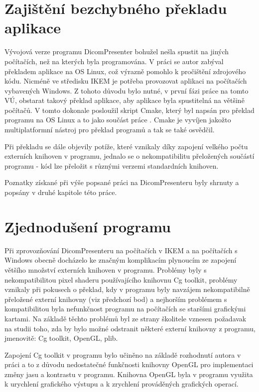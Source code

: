 \section{Zajištění bezchybného překladu aplikace}
Vývojová verze programu DicomPresenter bohužel nešla spustit na jiných počítačích, než na kterých byla programována. V práci \cite{flaska} se autor zabýval překladem aplikace na OS Linux, což výrazně pomohlo k pročištění zdrojového kódu. Nicméně ve středisku IKEM je potřeba provozovat aplikaci na počítačích vybavených Windows. Z tohoto důvodu bylo nutné, v první fázi práce na tomto VÚ, obstarat takový překlad aplikace, aby aplikace byla spustitelná na většině počítačů. V tomto dokonale posloužil skript Cmake, který byl napsán pro překlad programu na OS Linux a to jako součást práce \cite{flaska}. Cmake je vyvíjen jakožto multiplatformní nástroj pro překlad programů a tak se také osvědčil. 

Při překladu se dále objevily potíže, které vznikaly díky zapojení velkého počtu externích knihoven v programu, jednalo se o nekompatibilitu přeložených součástí programu - kód lze přeložit s různými verzemi standardních knihoven.

Poznatky získané při výše popsané práci na DicomPresenteru byly shrnuty a popsány v druhé kapitole této práce.

\section{Zjednodušení programu}
Při zprovozňování DicomPresenteru na počítačích v IKEM a na počítačích s Windows obecně docházelo ke značným komplikacím plynoucím ze zapojení většího množství externích knihoven v programu. Problémy byly s nekompatibilitou pixel shaderu používajícího knihovnu Cg toolkit, problémy vznikaly při pokusech o překlad, kdy v programu byly navzájem nekompatibilně přeložené externí knihovny (viz předchozí bod) a nejhorším problémem s kompatibilitou byla nefunkčnost programu na počítačích se staršími grafickými kartami. Na základě těchto problémů byl ze strany školitele vznesen požadavak na studii toho, zda by bylo možné odstranit některé externí knihovny z programu, jmenovitě: Cg toolkit, OpenGL, plib.

Zapojení Cg toolkit v programu bylo učiněno na základě rozhodnutí autora v práci \cite{neskudla} a to z důvodu nedostatečné funkčnosti knihovny OpenGL pro implementaci změny jasu a kontrastu v programu. Knihovna OpenGL byla v programu využita k urychlení grafického výstupu a k zrychlení prováděných grafických operací.

